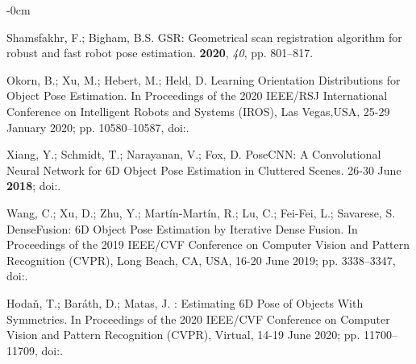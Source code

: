 \documentclass[micromachines,article,accept,pdftex,moreauthors]{Definitions/mdpi}
\begin{document}
\begin{adjustwidth}{-\extralength}{0cm}
\begin{thebibliography}{999}
Shamsfakhr, F.; Bigham, B.S.
\newblock GSR: Geometrical scan registration algorithm for robust and fast robot pose estimation.
 {{\bf 2020}, {\em {40}}, {pp. 801--817}}. %

Okorn, B.; Xu, M.; Hebert, M.; Held, D.
\newblock Learning Orientation Distributions for Object Pose Estimation.
\newblock In Proceedings of the 2020 IEEE/RSJ International Conference on Intelligent Robots and Systems (IROS), {Las Vegas,USA, 25-29 January 2020;} pp. 10580--10587, %
\newblock
doi:{\href{https://doi.org/10.1109/IROS45743.2020.9340860}{}}.

Xiang, Y.; Schmidt, T.; Narayanan, V.; Fox, D.
\newblock PoseCNN: A Convolutional Neural Network for 6D Object Pose Estimation in Cluttered Scenes.
 {26-30 June} {\bf {2018}}; %
\newblock
doi:{\href{https://doi.org/10.15607/RSS.2018.XIV.019}{}}. %

Wang, C.; Xu, D.; Zhu, Y.; Martín-Martín, R.; Lu, C.; Fei-Fei, L.; Savarese, S.
\newblock DenseFusion: 6D Object Pose Estimation by Iterative Dense Fusion.
\newblock In Proceedings of the  2019 IEEE/CVF Conference on Computer Vision and Pattern Recognition (CVPR), {Long Beach, CA, USA, 16-20 June 2019;} pp. 3338--3347,
\newblock
doi:{\href{https://doi.org/10.1109/CVPR.2019.00346}{}}.

Hodaň, T.; Baráth, D.; Matas, J.
: {{Estimating 6D Pose}} of {{Objects With Symmetries}}.
\newblock In Proceedings of the  2020 IEEE/CVF Conference on Computer Vision and Pattern Recognition {(CVPR), Virtual, 14-19 June 2020;} pp. 11700--11709,
\newblock
doi:{\href{https://doi.org/10.1109/CVPR42600.2020.01172}{}}. %


\end{thebibliography}
\end{adjustwidth}
\end{document}
